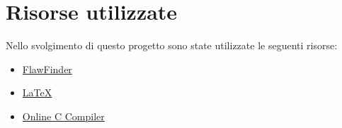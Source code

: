\documentclass[11pt]{article} %
\begin{document}
\section{Risorse utilizzate}
Nello svolgimento di questo progetto sono state utilizzate le seguenti risorse:
\begin{itemize}
\item{\href{https://dwheeler.com/flawfinder/}{FlawFinder}}
\item{\href{https://www.latex-project.org/}{\LaTeX}}
\item{\href{https://www.onlinegdb.com/}{Online C Compiler}}
\end{itemize}
\end{document}
